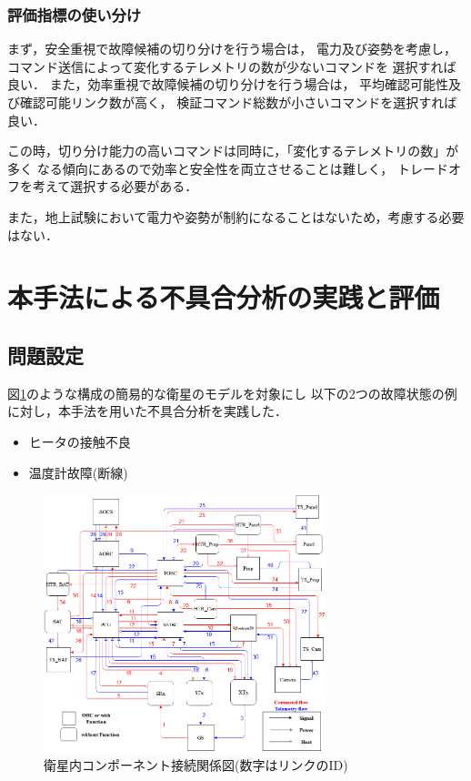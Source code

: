 \documentclass[11pt]{jsarticle}%
\begin{document}
\begin{multicols}{2}
\subsubsection{評価指標の使い分け}
まず，安全重視で故障候補の切り分けを行う場合は，
電力及び姿勢を考慮し，コマンド送信によって変化するテレメトリの数が少ないコマンドを
選択すれば良い．
また，効率重視で故障候補の切り分けを行う場合は，
平均確認可能性及び確認可能リンク数が高く，
検証コマンド総数が小さいコマンドを選択すれば良い．

この時，切り分け能力の高いコマンドは同時に，「変化するテレメトリの数」が多く
なる傾向にあるので効率と安全性を両立させることは難しく，
トレードオフを考えて選択する必要がある．　%

また，地上試験において電力や姿勢が制約になることはないため，考慮する必要はない．
\vspace{-1zh}
\section{本手法による不具合分析の実践と評価}
  \vspace{-1zh}
  \subsection{問題設定}
  \vspace{-1zh}
  図\ref{fig:satellite}のような構成の簡易的な衛星のモデルを対象にし
  以下の2つの故障状態の例に対し，本手法を用いた不具合分析を実践した．
  \begin{itemize}
   \item ヒータの接触不良
   \item 温度計故障(断線)
 \end{itemize}
  \begin{figure}[H]
    \centering
      \includegraphics[height=7.5cm]{../figure/satellite_diagram.png}
      \caption{衛星内コンポーネント接続関係図(数字はリンクのID)}
      \label{fig:satellite}
  \end{figure}
\vspace{-1zh}

\end{multicols}
\end{document}
